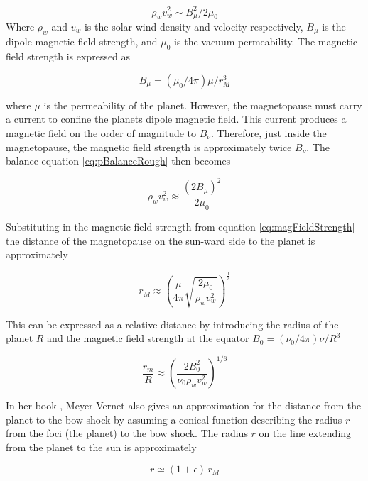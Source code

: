 \begin{equation}\label{eq:pBalanceRough}
\rho_w v^2_w \sim B^2_{\mu} / 2 \mu_0  
\end{equation}
Where $\rho_w$ and $v_w$ is the solar wind density and velocity respectively, $B_{\mu}$ is the dipole magnetic field strength, and $\mu_0$ is the vacuum permeability. The magnetic field strength is expressed as

\begin{equation}\label{eq:magFieldStrength}
    B_{\mu} = (\mu_0 / 4 \pi) \mu / r^3_M
\end{equation}

where $\mu$ is the permeability of the planet. However, the magnetopause must carry a current to confine the planets dipole magnetic field. This current produces a magnetic field on the order of magnitude to $B_{\nu}$. Therefore, just inside the magnetopause, the magnetic field strength is approximately twice $B_{\nu}$. The balance equation \eqref{eq:pBalanceRough} then becomes 

\begin{equation}\label{eq:pressureBalance}
    \rho_w v^2_w \approx \frac{(2 B_{\mu})^2}{2 \mu_0} 
\end{equation}

Substituting in the magnetic field strength from equation \eqref{eq:magFieldStrength} the distance of the magnetopause on the sun-ward side to the planet is approximately 

\begin{equation}\label{eq:magnetopause}
    r_M \approx \left(\frac{\mu}{4 \pi} \sqrt{\frac{2 \mu_0}{\rho_w v^2_w}} \right)^{\frac{1}{3}}
\end{equation}

This can be expressed as a relative distance by introducing the radius of the planet $R$ and the magnetic field strength at the equator $B_0 = (\nu_0 / 4 \pi) \nu / R^3$

\begin{equation}
    \frac{r_m}{R} \approx \left(\frac{2 B^2_0}{\nu_0 \rho_w v^2_w} \right)^{1/6}
\end{equation}


In her book \parencite{Meyer-Vernet2007}, Meyer-Vernet also gives an approximation for the distance from the planet to the bow-shock by assuming a conical function describing the radius $r$ from the foci (the planet) to the bow shock. The radius $r$ on the line extending from the planet to the sun is approximately

\begin{equation}
    r \simeq (1 + \epsilon) \, r_M
\end{equation}

